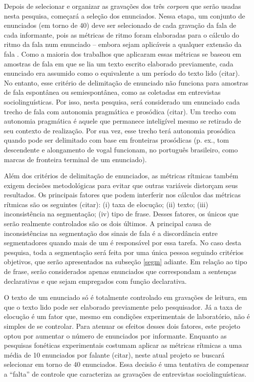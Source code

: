 \documentclass[
		a4paper,	%
		12pt,		%
		]{article}	%
\begin{document}
	Depois de selecionar e organizar as gravações dos três \emph{corpora} que
	serão usadas nesta pesquisa, começará a seleção dos enunciados. Nessa etapa,
	um conjunto de enunciados (em torno de 40) deve ser selecionado de cada
	gravação da fala de cada informante, pois as métricas de ritmo foram
	elaboradas para o cálculo do ritmo da fala num enunciado -- embora sejam
	aplicáveis a qualquer extensão da fala \citep{Fuchs2016}. Como a
	maioria dos trabalhos que aplicaram essas métricas se baseou em amostras de
	fala em que se lia um texto escrito elaborado previamente, cada enunciado
	era assumido como o equivalente a um período do texto lido (citar). No entanto, esse
	critério de delimitação de enunciado não funciona para amostras de fala
	espontânea ou semiespontânea, como as coletadas em entrevistas
	sociolinguísticas. Por isso, nesta pesquisa, será considerado um enunciado
	cada trecho de fala com autonomia pragmática e prosódica (citar). Um trecho com
	autonomia pragmática é aquele que permanece inteligível mesmo se retirado de
	seu contexto de realização. Por sua vez, esse trecho terá autonomia
	prosódica quando pode ser delimitado com base em fronteiras prosódicas (p.
	ex., tom descendente e alongamento de vogal funcionam, no português
	brasileiro, como marcas de fronteira terminal de um enunciado). 

	Além dos critérios de delimitação de enunciados, as métricas rítmicas também
	exigem decisões metodológicas para evitar que outras variáveis distorçam
	seus resultados. Os principais fatores que podem interferir nos cálculos das
	métricas rítmicas são os seguintes (citar): (i) taxa de elocução; (ii)
	texto; (iii)  inconsistência na segmentação; (iv) tipo de frase. Desses
	fatores, os únicos que serão realmente controlados são os dois últimos. A
	principal causa de inconsistências na segmentação dos sinais de fala é a
	discordância entre segmentadores quando mais de um é responsável por essa
	tarefa. No caso desta pesquisa, toda a segmentação será feita por uma única
	pessoa seguindo critérios objetivos, que serão apresentados na subseção
	\ref{segm} adiante. Em relação ao tipo de frase, serão considerados apenas
	enunciados que correspondam a sentenças declarativas e que sejam empregados
	com função declarativa.

	O texto de um enunciado só é totalmente controlado em gravações de leitura,
	em que o texto lido pode ser elaborado previamente pelo pesquisador. Já a
	taxa de elocução é um fator que, mesmo em condições experimentais de
	laboratório, não é simples de se controlar. Para atenuar os efeitos desses
	dois fatores, este projeto optou por aumentar o número de
	enunciados por informante. Enquanto as pesquisas fonéticas experimentais
	costumam aplicar as métricas rítmicas a uma média de 10 enunciados por
	falante (citar), neste atual projeto se buscará selecionar em torno de 40
	enunciados. Essa decisão é uma tentativa de compensar a \enquote{falta} de
	controle que caracteriza as gravações de entrevistas sociolinguísticas.
\end{document}
